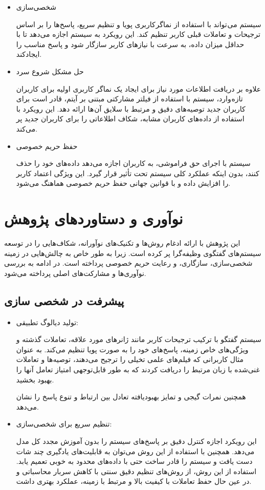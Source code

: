 \begin{itemize}
\item
شخصی‌سازی

سیستم می تواند با استفاده از نماگر کاربری پویا و تنظیم سریع، پاسخ‌ها را بر اساس ترجیحات و تعاملات قبلی کاربر تنظیم ‌کند. این رویکرد به سیستم اجازه می‌دهد تا با حداقل میزان داده، به سرعت با نیازهای کاربر سازگار شود و پاسخ مناسب را ایجادکند.
\item
حل مشکل شروع سرد

علاوه بر دریافت اطلاعات مورد نیاز برای ایجاد یک نماگر کاربری اولیه برای کاربران تازه وارد، سیستم با استفاده از فیلتر مشارکتی مبتنی بر آیتم، قادر است برای کاربران جدید توصیه‌های دقیق و مرتبط با سلایق آن ها ارائه دهد. این رویکرد با استفاده از داده‌های کاربران مشابه، شکاف اطلاعاتی را برای کاربران جدید پر می‌کند.
\item
حفظ حریم خصوصی

سیستم با اجرای حق فراموشی، به کاربران اجازه می‌دهد داده‌های خود را حذف کنند، بدون اینکه عملکرد کلی سیستم تحت تأثیر قرار گیرد. این ویژگی اعتماد کاربر را افزایش داده و با قوانین جهانی حفظ حریم خصوصی هماهنگ می‌شود.
\end{itemize}


\section{نوآوری و دستاوردهای پژوهش}
این پژوهش با ارائه ادغام روش‌ها و تکنیک‌های نوآورانه، شکاف‌هایی را در توسعه سیستم‌های گفتگوی وظیفه‌گرا پر کرده است. زیرا به طور خاص به چالش‌هایی در زمینه شخصی‌سازی، سازگاری، و رعایت حریم خصوصی پرداخته است. در ادامه به بررسی نوآوری‌ها و مشارکت‌های اصلی پرداخته می‌شود.

\subsection{پیشرفت در شخصی سازی}
\begin{itemize}
\item
تولید دیالوگ تطبیقی:
 
سیستم گفتگو با ترکیب ترجیحات کاربر مانند ژانرهای مورد علاقه، تعاملات گذشته و ویژگی‌های خاص زمینه، پاسخ‌های خود را به صورت پویا تنظیم می‌کند. به عنوان مثال کاربرانی که فیلم‌های علمی تخیلی را ترجیح می‌دهند، توصیه‌ها و تعاملات غنی‌شده با زبان مرتبط را دریافت کردند که به طور قابل‌توجهی امتیاز تعامل آنها را بهبود بخشید.

همچنین نمرات گیجی و تمایز بهبود‌یافته تعادل بین ارتباط و تنوع پاسخ را نشان می‌دهد.
\item
 تنظیم سریع برای شخصی‌سازی:

 این رویکرد اجازه کنترل دقیق بر پاسخ‌های سیستم را بدون آموزش مجدد کل مدل می‌دهد. همچنین با استفاده از این روش می‌توان به قابلیت‌های یادگیری چند شات دست یافت و سیستم را قادر ساخت حتی با داده‌های محدود به خوبی تعمیم یابد.
استفاده از این روش، از روش‌های تنظیم دقیق سنتی با کاهش سربار محاسباتی و در عین حال حفظ تعاملات با کیفیت بالا و مرتبط با زمینه، عملکرد بهتری داشت.
\end{itemize}
